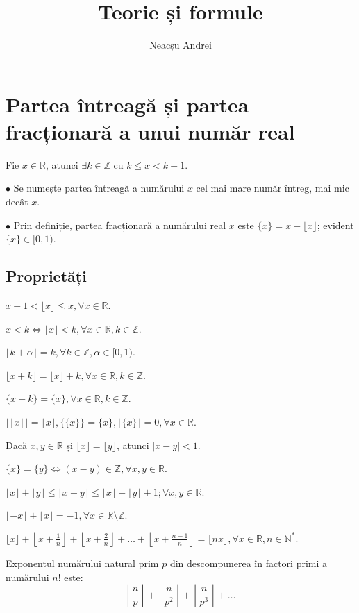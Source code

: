 \documentclass[11pt,a4paper]{article}
\author{Neacșu Andrei}
\title{Teorie și formule}
\date{}
\begin{document}
\maketitle
\section{Partea întreagă și partea fracționară a unui număr real}
 Fie $x\in \mathbb{R}$, atunci $\exists k \in \mathbb{Z}$ cu $k \leq x < k+1$. 

	$\bullet$ Se numește partea întreagă a numărului $x$ cel mai mare număr întreg, mai mic decât $x$.

$\bullet$	Prin definiție, partea fracționară a numărului real $x$ este $\{x\}=x-\lfloor x \rfloor$; evident $\{x\} \in [0,1)$.
\subsection{Proprietăți}
\begin{Properties}
  \item $x-1 < \lfloor x \rfloor \leq x,  \forall x \in \mathbb{R}$. 
  \item $x <k \Longleftrightarrow \lfloor x \rfloor < k, \forall x \in \mathbb{R}, k \in \mathbb{Z}$.
  \item $\lfloor k + \alpha \rfloor =k, \forall k \in \mathbb{Z}, \alpha \in [0,1)$.
  \item $\lfloor x + k \rfloor = \lfloor x \rfloor +k, \forall x \in \mathbb{R}, k \in \mathbb{Z}$.
  \item $\{x+k\}=\{x\}, \forall x \in \mathbb{R}, k \in \mathbb{Z}$.
  \item $\lfloor \lfloor x \rfloor \rfloor=\lfloor x \rfloor, \{\{x\}\}=\{x\}, \lfloor \{x\} \rfloor=0, \forall x \in \mathbb{R}$.
  \item Dacă $x, y \in \mathbb{R}$ și $\lfloor x \rfloor = \lfloor y \rfloor$, atunci $\lvert x-y \rvert <1$.
  \item $\{x\}=\{y\} \Longleftrightarrow (x-y)\in \mathbb{Z}, \forall x, y \in \mathbb{R}$.
  \item $\lfloor x \rfloor+ \lfloor y \rfloor \leq \lfloor x+y \rfloor \leq  \lfloor x \rfloor+ \lfloor y \rfloor +1; \forall x, y \in \mathbb{R}$.
  \item  $\lfloor -x \rfloor + \lfloor x \rfloor = -1, \forall x \in \mathbb{R} \setminus \mathbb{Z}$.
  \item $\lfloor x \rfloor + \left\lfloor x + \frac{1}{n} \right\rfloor + \left\lfloor x + \frac{2}{n} \right\rfloor + \ldots +  \left\lfloor x + \frac{n-1}{n} \right\rfloor = \lfloor nx \rfloor, \forall x \in \mathbb{R}, n \in \mathbb{N}^*$.
  \item Exponentul numărului natural prim $p$ din descompunerea în factori primi a numărului $n!$ este:\[ \left\lfloor \frac{n}{p}  \right\rfloor + \left\lfloor \frac{n}{p^2} \right\rfloor +\left\lfloor \frac{n}{p^3}\right\rfloor + \ldots \]
\end{Properties}
\end{document}
